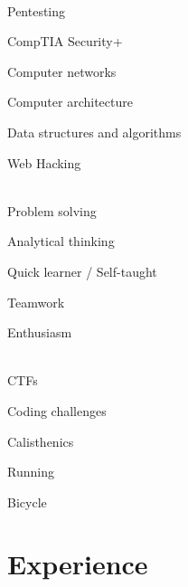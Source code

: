 \documentclass[a4paper]{article}
\begin{document}
\begin{paracol}{2}
\bigskip

 \\[0.5em]
Pentesting

CompTIA Security+

Computer networks

Computer architecture

Data structures and algorithms

Web Hacking

\bigskip

 \\[0.5em]
Problem solving

Analytical thinking

Quick learner / Self-taught

Teamwork

Enthusiasm

\bigskip

\\[0.5em]

CTFs

Coding challenges

Calisthenics

Running

Bicycle

\bigskip



\switchcolumn

\small
\justify

\vspace{-5em}

\section*{\faBriefcase \; Experience}


\end{paracol}
\end{document}
